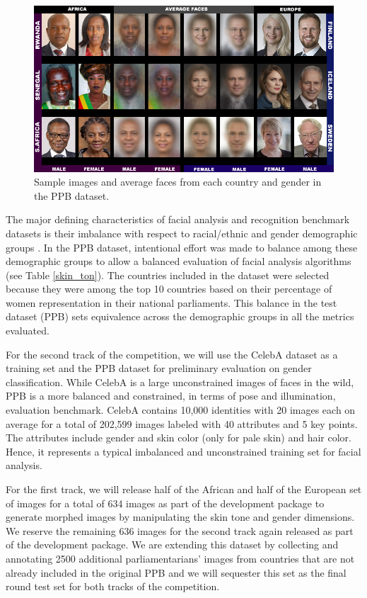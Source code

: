 \documentclass[11pt, oneside]{article}
\makeatletter
\let\@internalcite\cite
\def\cite{\def\citeauthoryear##1##2{##1, ##2}\@internalcite}
\makeatother
\begin{document}
\begin{figure}[t]
    \label{fig_ppb}
    \centering
    \includegraphics[width=140mm]{fig/ppb}
    \caption{Sample images and average faces from each country and gender in the PPB dataset.}
\end{figure}



The major defining characteristics of facial analysis and recognition benchmark datasets is their imbalance with respect to racial/ethnic and gender demographic groups \cite{phillips2011other, han2015demographic}. In the PPB dataset, intentional effort was made to balance among these demographic groups to allow a balanced evaluation of facial analysis algorithms (see Table \ref{skin_ton}). The countries included in the dataset were selected because they were among the top 10 countries based on their percentage of women representation in their national parliaments. This balance in the test dataset (PPB) sets equivalence across the demographic groups in all the metrics evaluated.



For the second track of the competition, we will use the CelebA dataset \cite{liu2015deep} as a training set and the PPB dataset for preliminary evaluation on gender classification. While CelebA is a large unconstrained images of faces in the wild, PPB is a more balanced and constrained, in terms of pose and illumination, evaluation benchmark. CelebA contains 10,000 identities with 20 images each on average for a total of 202,599 images labeled with 40 attributes and 5 key points. The attributes include gender and skin color (only for pale skin) and hair color. Hence, it represents a typical imbalanced and unconstrained training set for facial analysis.

For the first track, we will release half of the African and half of the European set of images for a total of 634 images as part of the development package to generate morphed images by manipulating the skin tone and gender dimensions. We reserve the remaining 636 images for the second track again released as part of the development package. We are extending this dataset by collecting and annotating 2500 additional parliamentarians' images from countries that are not already included in the original PPB and we will sequester this set as the final round test set for both tracks of the competition. 
\end{document}
